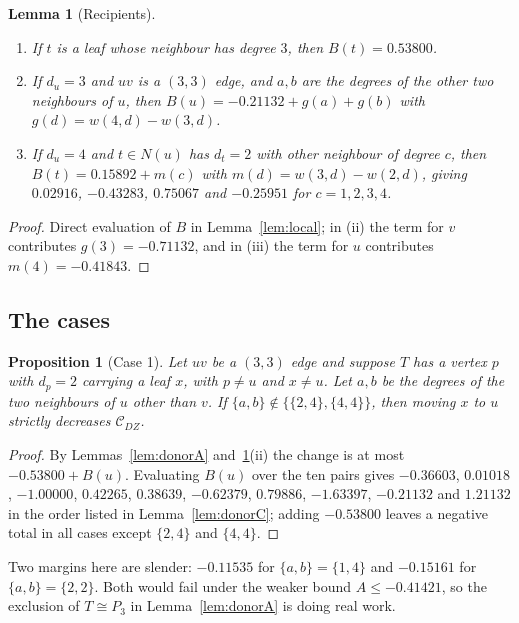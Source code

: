 \documentclass[11pt,a4paper]{article}
\theoremstyle{plain}
\newtheorem{proposition}[theorem]{Proposition}
\newtheorem{lemma}[theorem]{Lemma}
\theoremstyle{definition}
\theoremstyle{remark}
\newcommand{\CDZ}{\mathcal{C}_{DZ}}
\begin{document}
\begin{lemma}[Recipients]
\label{lem:recipients}
\begin{enumerate}
\item If $t$ is a leaf whose neighbour has degree $3$, then $B(t)=0.53800$.
\item If $d_u=3$ and $uv$ is a $(3,3)$ edge, and $a,b$ are the degrees of the
      other two neighbours of $u$, then $B(u)=-0.21132+g(a)+g(b)$ with
      $g(d)=w(4,d)-w(3,d)$.
\item If $d_u=4$ and $t\in N(u)$ has $d_t=2$ with other neighbour of degree $c$,
      then $B(t)=0.15892+m(c)$ with $m(d)=w(3,d)-w(2,d)$, giving $0.02916$,
      $-0.43283$, $0.75067$ and $-0.25951$ for $c=1,2,3,4$.
\end{enumerate}
\end{lemma}

\begin{proof}
Direct evaluation of $B$ in Lemma~\ref{lem:local}; in (ii) the term for $v$
contributes $g(3)=-0.71132$, and in (iii) the term for $u$ contributes
$m(4)=-0.41843$.
\end{proof}

\subsection*{The cases}

\begin{proposition}[Case 1]
\label{prop:case1}
Let $uv$ be a $(3,3)$ edge and suppose $T$ has a vertex $p$ with $d_p=2$ carrying
a leaf $x$, with $p\ne u$ and $x\ne u$. Let $a,b$ be the degrees of the two
neighbours of $u$ other than $v$. If
$\{a,b\}\notin\bigl\{\{2,4\},\{4,4\}\bigr\}$, then moving $x$ to $u$ strictly
decreases $\CDZ$.
\end{proposition}

\begin{proof}
By Lemmas~\ref{lem:donorA} and~\ref{lem:recipients}(ii) the change is at most
$-0.53800+B(u)$. Evaluating $B(u)$ over the ten pairs gives $-0.36603$,
$0.01018$, $-1.00000$, $0.42265$, $0.38639$, $-0.62379$, $0.79886$, $-1.63397$,
$-0.21132$ and $1.21132$ in the order listed in Lemma~\ref{lem:donorC}; adding
$-0.53800$ leaves a negative total in all cases except $\{2,4\}$ and $\{4,4\}$.
\end{proof}

Two margins here are slender: $-0.11535$ for $\{a,b\}=\{1,4\}$ and $-0.15161$ for
$\{a,b\}=\{2,2\}$. Both would fail under the weaker bound $A\le-0.41421$, so the
exclusion of $T\cong P_3$ in Lemma~\ref{lem:donorA} is doing real work.
\end{document}
